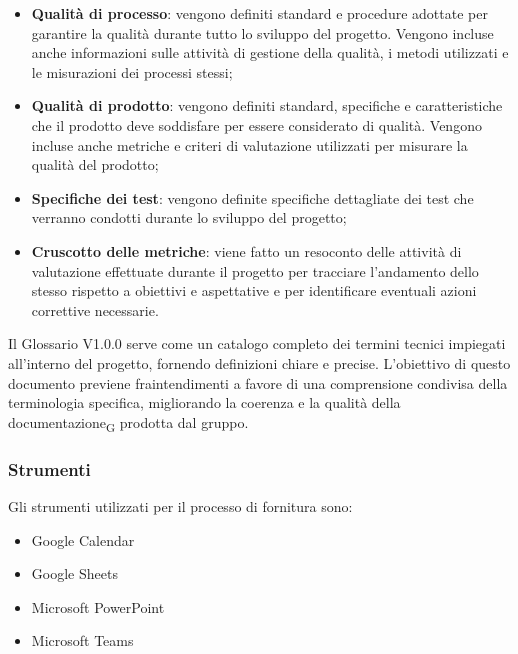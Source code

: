 \begin{itemize}
    \item \textbf{Qualità di processo}: vengono definiti standard e procedure adottate per garantire la qualità durante tutto lo sviluppo del progetto. Vengono incluse anche informazioni sulle attività di gestione della qualità, i metodi utilizzati e le misurazioni dei processi stessi;
    \item \textbf{Qualità di prodotto}: vengono definiti standard, specifiche e caratteristiche che il prodotto deve soddisfare per essere considerato di qualità. Vengono incluse anche metriche e criteri di valutazione utilizzati per misurare la qualità del prodotto;
    \item \textbf{Specifiche dei test}: vengono definite specifiche dettagliate dei test che verranno condotti durante lo sviluppo del progetto;
    \item \textbf{Cruscotto delle metriche}: viene fatto un resoconto delle attività di valutazione effettuate durante il progetto per tracciare l'andamento dello stesso rispetto a obiettivi e aspettative e per identificare eventuali azioni correttive necessarie.
\end{itemize}

Il Glossario V1.0.0 serve come un catalogo completo dei termini tecnici impiegati all'interno del progetto, fornendo definizioni chiare e precise. L'obiettivo di questo documento previene fraintendimenti a favore di una comprensione condivisa della terminologia specifica, migliorando la coerenza e la qualità della documentazione\textsubscript{G} prodotta dal gruppo.

\subsubsection{Strumenti}
Gli strumenti utilizzati per il processo di fornitura sono:
\begin{itemize}
    \item Google Calendar
    \item Google Sheets
    \item Microsoft PowerPoint
    \item Microsoft Teams
\end{itemize}